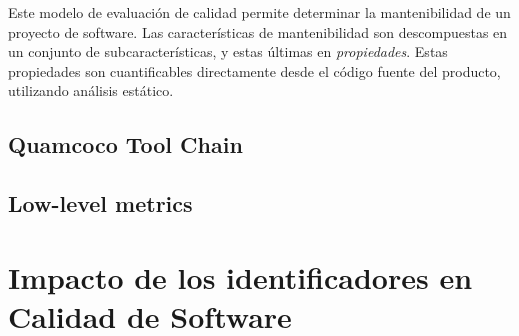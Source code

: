 Este modelo de evaluación de calidad \cite{Heitlager2007} permite determinar la mantenibilidad
de un proyecto de software.
Las características de mantenibilidad son descompuestas en un conjunto de subcaracterísticas,
y estas últimas en \textit{propiedades}.
Estas propiedades son cuantificables directamente desde el código fuente del producto, utilizando
análisis estático.


\subsection{Quamcoco Tool Chain}

\subsection{Low-level metrics}

\section{Impacto de los identificadores en Calidad de Software}
